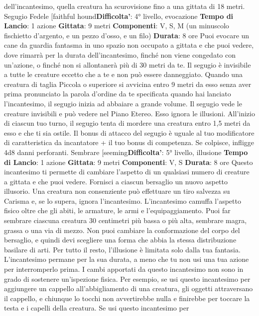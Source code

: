 \begin{multicols}{2}
dell’incantesimo, quella creatura ha scurovisione fino a
una gittata di 18 metri.
Segugio Fedele
[faithful hound\textbf{Difficolta'}:
4° livello, evocazione
\textbf{Tempo di Lancio}: 1 azione
\textbf{Gittata}: 9 metri
\textbf{Componenti}: V, S, M (un minuscolo fischietto
d’argento, e un pezzo d’osso, e un filo)
\textbf{Durata}: 8 ore
Puoi evocare un cane da guardia fantasma in uno
spazio non occupato a gittata e che puoi vedere, dove
rimarrà per la durata dell’incantesimo, finché non viene
congedato con un’azione, o finché non si allontanerà
più di 30 metri da te.
Il segugio è invisibile a tutte le creature eccetto che a te
e non può essere danneggiato. Quando una creatura di
taglia Piccola o superiore si avvicina entro 9 metri da
esso senza aver prima pronunciato la parola d’ordine
da te specificata quando hai lanciato l’incantesimo, il
segugio inizia ad abbaiare a grande volume. Il segugio
vede le creature invisibili e può vedere nel Piano
Etereo. Esso ignora le illusioni.
All’inizio di ciascun tuo turno, il segugio tenta di
mordere una creatura entro 1,5 metri da esso e che ti
sia ostile. Il bonus di attacco del segugio è uguale al tuo
modificatore di caratteristica da incantatore + il tuo
bonus di competenza. Se colpisce, infligge 4d8 danni
perforanti.
Sembrare
[seeming\textbf{Difficolta'}:
5° livello, illusione
\textbf{Tempo di Lancio}: 1 azione
\textbf{Gittata}: 9 metri
\textbf{Componenti}: V, S
\textbf{Durata}: 8 ore
Questo incantesimo ti permette di cambiare l’aspetto di
un qualsiasi numero di creature a gittata e che puoi
vedere. Fornisci a ciascun bersaglio un nuovo aspetto
illusorio. Una creatura non consenziente può effettuare
un tiro salvezza su Carisma e, se lo supera, ignora
l’incantesimo.
L’incantesimo camuffa l’aspetto fisico oltre che gli abiti,
le armature, le armi e l’equipaggiamento. Puoi far
sembrare ciascuna creatura 30 centimetri più bassa o
più alta, sembrare magra, grassa o una via di mezzo.
Non puoi cambiare la conformazione del corpo del
bersaglio, e quindi devi scegliere una forma che abbia
la stessa distribuzione basilare di arti. Per tutto il resto,
l’illusione è limitata solo dalla tua fantasia.
L’incantesimo permane per la sua durata, a meno che
tu non usi una tua azione per interromperlo prima.
I cambi apportati da questo incantesimo non sono in
grado di sostenere un’ispezione fisica. Per esempio, se
usi questo incantesimo per aggiungere un cappello
all’abbigliamento di una creatura, gli oggetti
attraversano il cappello, e chiunque lo tocchi non
avvertirebbe nulla e finirebbe per toccare la testa e i
capelli della creatura. Se usi questo incantesimo per

\end{multicols}
